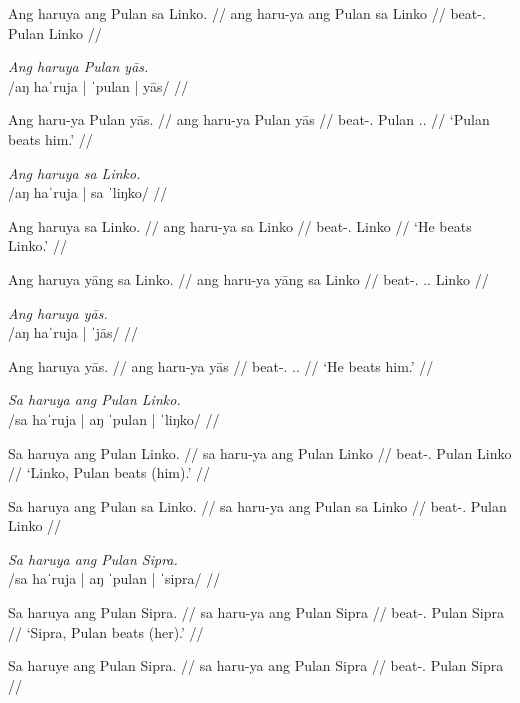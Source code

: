 \documentclass[12pt,a4paper]{scrartcl}
\newcommand{\TsgM}{{\Tsg}.{\M}}
\newcommand{\TsgF}{{\Tsg}.{\F}}
\begin{document}
\a\ljudge*\begingl
\gla Ang haruya ang Pulan sa Linko. //
\glb ang haru-ya ang Pulan sa Linko //
\glc \AgtT{} beat-\TsgM{} \Aarg{} Pulan \Parg{} Linko //
\endgl
\xe

\ex\begingl
\glpreamble \textit{Ang haruya Pulan yās.}\\
	/aŋ haˈruja | ˈpulan | yās/ //

\gla Ang haru-ya Pulan yās. //
\glb ang haru-ya Pulan yās //
\glc \AgtT{} beat-\TsgM{} Pulan \TsgM{}.\Parg{} //
\glft `Pulan beats him.' //
\endgl\xe

\pex
\a\begingl
\glpreamble \textit{Ang haruya sa Linko.} \\
	/aŋ haˈruja | sa ˈliŋko/ //

\gla Ang haruya sa Linko. //
\glb ang haru-ya sa Linko //
\glc \AgtT{} beat-\TsgM{} \Parg{} Linko //
\glft `He beats Linko.' //
\endgl

\a\ljudge*\begingl
\gla Ang haruya yāng sa Linko. //
\glb ang haru-ya yāng sa Linko //
\glc \AgtT{} beat-\TsgM{} \TsgM{}.\Aarg{} \Parg{} Linko //
\endgl
\xe

\ex\begingl
\glpreamble \textit{Ang haruya yās.}\\
	/aŋ haˈruja | ˈjās/ //

\gla Ang haruya yās. //
\glb ang haru-ya yās //
\glc \AgtT{} beat-\TsgM{} \TsgM{}.\Parg{} //
\glft `He beats him.' //
\endgl\xe

\pex
\a\begingl
\glpreamble \textit{Sa haruya ang Pulan Linko.} \\
	/sa haˈruja | aŋ ˈpulan | ˈliŋko/ //

\gla Sa haruya ang Pulan Linko. //
\glb sa haru-ya ang Pulan Linko //
\glc \PatT{} beat-\TsgM{} \Aarg{} Pulan Linko //
\glft `Linko, Pulan beats (him).' //
\endgl

\a\ljudge*\begingl
\gla Sa haruya ang Pulan sa Linko. //
\glb sa haru-ya ang Pulan sa Linko //
\glc \PatT{} beat-\TsgM{} \Aarg{} Pulan \Parg{} Linko //
\endgl\xe

\pex
\a\begingl
\glpreamble \textit{Sa haruya ang Pulan Sipra.} \\
	/sa haˈruja | aŋ ˈpulan | ˈsipra/ //

\gla Sa haruya ang Pulan Sipra. //
\glb sa haru-ya ang Pulan Sipra //
\glc \PatT{} beat-\TsgM{} \Aarg{} Pulan Sipra //
\glft `Sipra, Pulan beats (her).' //
\endgl

\a\ljudge*\begingl
\gla Sa haruye ang Pulan Sipra. //
\glb sa haru-ya ang Pulan Sipra //
\glc \PatT{} beat-\TsgF{} \Aarg{} Pulan Sipra //
\endgl\xe
\end{document}
